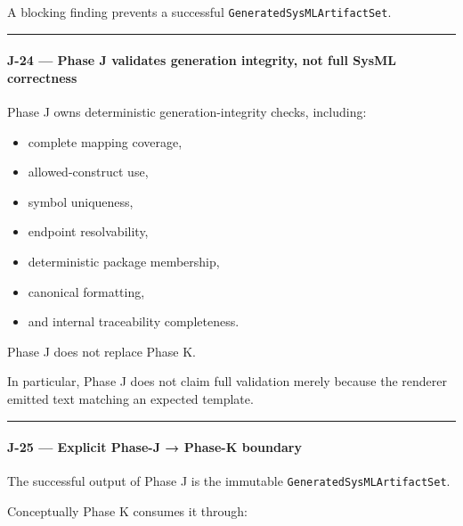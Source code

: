 A blocking finding prevents a successful \texttt{GeneratedSysMLArtifactSet}.

\begin{center}\rule{0.5\linewidth}{0.5pt}\end{center}

\hypertarget{j-24--phase-j-validates-generation-integrity-not-full-sysml-correctness}{%
\paragraph{J-24 --- Phase J validates generation integrity, not full SysML correctness}\label{j-24--phase-j-validates-generation-integrity-not-full-sysml-correctness}}

Phase J owns deterministic generation-integrity checks, including:

\begin{itemize}
\tightlist
\item
  complete mapping coverage,
\item
  allowed-construct use,
\item
  symbol uniqueness,
\item
  endpoint resolvability,
\item
  deterministic package membership,
\item
  canonical formatting,
\item
  and internal traceability completeness.
\end{itemize}

Phase J does not replace Phase K.

In particular, Phase J does not claim full validation merely because the renderer emitted text matching an expected template.

\begin{center}\rule{0.5\linewidth}{0.5pt}\end{center}

\hypertarget{j-25--explicit-phase-j--phase-k-boundary}{%
\paragraph{J-25 --- Explicit Phase-J → Phase-K boundary}\label{j-25--explicit-phase-j--phase-k-boundary}}

The successful output of Phase J is the immutable \texttt{GeneratedSysMLArtifactSet}.

Conceptually Phase K consumes it through:

\begin{Shaded}
\begin{Highlighting}[]
\NormalTok{) }\OperatorTok{{-}\textgreater{}}
\end{Highlighting}
\end{Shaded}


